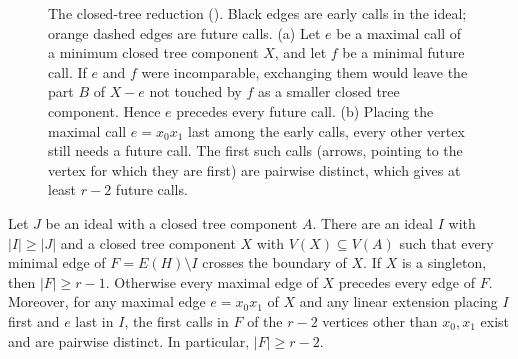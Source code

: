 \documentclass[USenglish, a4paper, thm-restate,numberwithinsect, cleveref]{lipics-v2021}
\begin{document}
\begin{figure}[t]
\caption{The closed-tree reduction
(). Black edges are early
calls in the ideal; orange dashed edges are future calls.
(a) Let $e$ be a maximal call of a minimum closed tree component $X$, and
let $f$ be a minimal future call. If $e$ and $f$ were incomparable,
exchanging them would leave the part $B$ of $X-e$ not touched by $f$ as a
smaller closed tree component. Hence $e$ precedes every future call.
(b) Placing the maximal call $e=x_0x_1$ last among the early calls, every
other vertex still needs a future call. The first such calls (arrows,
pointing to the vertex for which they are first) are pairwise distinct,
which gives at least $r-2$ future calls.}
\label{fig:closed-tree}
\end{figure}

\begin{lemma}\label{lem:characterization-closed-tree-reduction}
Let $J$ be an ideal with a closed tree component $A$. There are an
ideal $I$ with $|I|\ge|J|$ and a closed tree component $X$ with
$V(X)\subseteq V(A)$ such that every minimal edge of
$F=E(H)\setminus I$ crosses the boundary of $X$.
If $X$ is a singleton, then $|F|\ge r-1$. Otherwise every maximal
edge of $X$ precedes every edge of $F$. Moreover, for any maximal
edge $e=x_0x_1$ of $X$ and any linear extension placing $I$ first
and $e$ last in $I$, the first calls in $F$ of the $r-2$ vertices
other than $x_0,x_1$ exist and are pairwise distinct. In particular,
$|F|\ge r-2$.
\end{lemma}
\end{document}
